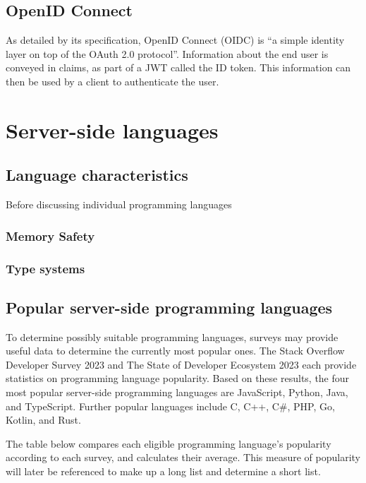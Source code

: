 \subsection{OpenID Connect}
As detailed by its specification, OpenID Connect (OIDC) is ``a simple identity layer on top of the OAuth 2.0 protocol''. Information about the end user is conveyed in claims, as part of a JWT called the ID token. This information can then be used by a client to authenticate the user. \autocite{Sakimura2014} 

\section{Server-side languages}
\subsection{Language characteristics}
Before discussing individual programming languages
\subsubsection{Memory Safety}

\subsubsection{Type systems}

\subsection{Popular server-side programming languages}
To determine possibly suitable programming languages, surveys may provide useful data to determine the currently most popular ones. The Stack Overflow Developer Survey 2023 \autocite{StackOverflow2023} and The State of Developer Ecosystem 2023 \autocite{JetBrains2023} each provide statistics on programming language popularity. Based on these results, the four most popular server-side programming languages are JavaScript, Python, Java, and TypeScript. Further popular languages include C, C++, C\#, PHP, Go, Kotlin, and Rust.

The table below compares each eligible programming language's popularity according to each survey, and calculates their average. This measure of popularity will later be referenced to make up a long list and determine a short list.

